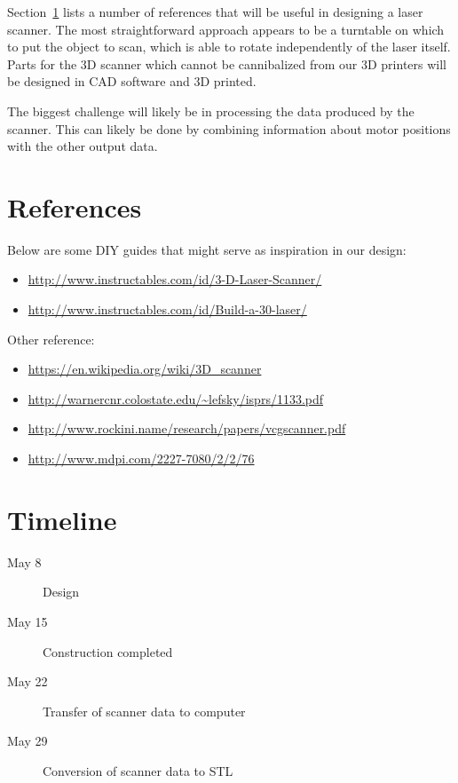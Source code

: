 \documentclass[12pt, letterpaper]{article}
\begin{document}
Section~\ref{refs} lists a number of references that will be useful in designing a
laser scanner. The most straightforward approach appears to be a turntable on which
to put the object to scan, which is able to rotate independently of the laser itself.
Parts for the 3D scanner which cannot be cannibalized from our 3D printers will be
designed in CAD software and 3D printed.

The biggest challenge will likely be in processing the data produced by the scanner.
This can likely be done by combining information about motor positions with the
other output data.

\section{References} \label{refs}

Below are some DIY guides that might serve as inspiration in our design:
\begin{itemize}
    \item \url{http://www.instructables.com/id/3-D-Laser-Scanner/}
    \item \url{http://www.instructables.com/id/Build-a-30-laser/}
\end{itemize}
Other reference:
\begin{itemize}
    \item \url{https://en.wikipedia.org/wiki/3D\_scanner}
    \item \url{http://warnercnr.colostate.edu/~lefsky/isprs/1133.pdf}
    \item \url{http://www.rockini.name/research/papers/vcgscanner.pdf}
    \item \url{http://www.mdpi.com/2227-7080/2/2/76}
\end{itemize}

\section{Timeline}

\begin{description}
    \item[May 8] Design
    \item[May 15] Construction completed
    \item[May 22] Transfer of scanner data to computer
    \item[May 29] Conversion of scanner data to STL
\end{description}
\end{document}
